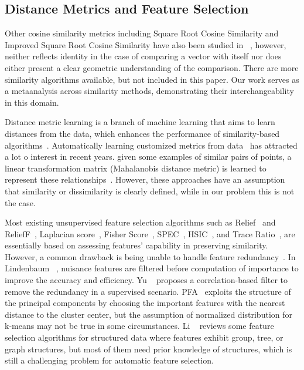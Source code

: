 \subsection{Distance Metrics and Feature Selection}
Other cosine similarity metrics including Square Root Cosine Similarity and Improved Square Root Cosine Similarity have also been studied in ~\cite{sohangir2017improved}, however, neither reflects identity in the case of comparing a vector with itself nor does either present a clear geometric understanding of the comparison. There are more similarity algorithms available, but not included in this paper. Our work serves as a metaanalysis across similarity methods, demonstrating their interchangeability in this domain. 

Distance metric learning is a branch of machine learning that aims to learn distances from
the data, which enhances the performance of similarity-based algorithms~\cite{suarez2021tutorial}. Automatically learning customized metrics from data~\cite{bellet2013survey} has attracted a lot o interest in recent years. \eg given some examples of similar pairs of points, a linear transformation matrix (Mahalanobis distance metric) is learned to represent these relationships~\cite{xing2002distance,weinberger2009distance}. However, these approaches have an assumption that similarity or dissimilarity is clearly defined, while in our problem this is not the case.


Most existing unsupervised feature selection algorithms such as Relief~\cite{kira1992practical} and ReliefF~\cite{kononenko1997overcoming}, Laplacian score~\cite{he2005laplacian}, Fisher Score~\cite{jennrich1976newton}, SPEC~\cite{nguyen2014effective}, HSIC~\cite{yamada2012high}, and Trace Ratio~\cite{nie2008trace}, are essentially based on assessing features' capability in preserving similarity. However, a common drawback is being unable to handle feature redundancy~\cite{zhao2011similarity}. In Lindenbaum \etal~\cite{lindenbaum2021differentiable}, nuisance features are filtered before computation of importance to improve the accuracy and efficiency. Yu \etal~\cite{yu2003feature} proposes a correlation-based filter to remove the redundancy in a supervised scenario.
PFA~\cite{lu2007feature} exploits the structure of the principal components by choosing the important features with the nearest distance to the cluster center, but the assumption of normalized distribution for k-means may not be true in some circumstances. Li \etal~\cite{li2018feature} reviews some feature selection algorithms for structured data where features exhibit group, tree, or graph structures, but most of them need prior knowledge of structures, which is still a challenging problem for automatic feature selection.

